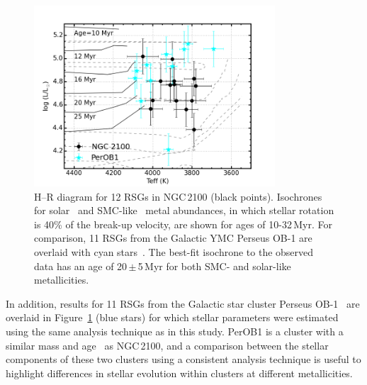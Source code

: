 \documentclass[useAMS,usenatbib]{mn2e}
\begin{document}
\begin{figure}
 \includegraphics[width=9.0cm]{NGC2100-HRD-perOB1}
 \caption{H--R diagram for 12 RSGs in NGC\,2100 (black points).
  Isochrones for solar~\citep[dashed grey lines;][]{2012A&A...537A.146E} and SMC-like~\citep[solid black lines;][]{2013A&A...558A.103G} metal abundances,
  in which stellar rotation is 40\% of the break-up velocity, are shown for ages of 10-32\,Myr. For comparison, 11 RSGs from the Galactic YMC Perseus OB-1 are overlaid with cyan stars~\citep{2014ApJ...788...58G}.
  The best-fit isochrone to the observed data has an age of 20\,$\pm$\,5\,Myr for both SMC- and solar-like metallicities.
  \label{fig:HRD}
          }
\end{figure}

In addition, results for 11 RSGs from the Galactic star cluster Perseus OB-1~\citep[PerOB1;][]{2014ApJ...787..142G} are overlaid in Figure~\ref{fig:HRD} (blue stars) for which stellar parameters were estimated using the same analysis technique as in this study.
PerOB1 is a cluster with a similar mass and age~\citep[$2\times10^{4}\,$M$_{\odot}$ and 14\,Myr respectively;][]{2010ApJS..186..191C}
as NGC\,2100, and a comparison between the stellar components of these two clusters using a consistent analysis technique is useful to highlight differences in stellar evolution within clusters at different metallicities.
\end{document}
